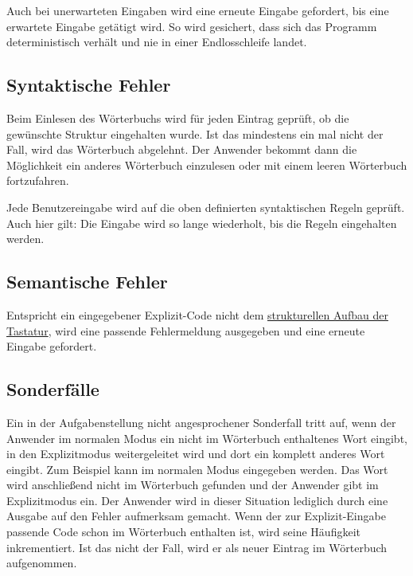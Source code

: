 Auch bei unerwarteten Eingaben wird eine erneute Eingabe gefordert, bis eine erwartete Eingabe getätigt wird.
So wird gesichert, dass sich das Programm deterministisch verhält und nie in einer Endlosschleife landet.

\subsection{Syntaktische Fehler}\label{subsec:syntaktische-fehler-behandlung}
Beim Einlesen des Wörterbuchs wird für jeden Eintrag geprüft, ob die gewünschte Struktur eingehalten wurde.
Ist das mindestens ein mal nicht der Fall, wird das Wörterbuch abgelehnt.
Der Anwender bekommt dann die Möglichkeit ein anderes Wörterbuch einzulesen oder mit einem leeren Wörterbuch fortzufahren.

Jede Benutzereingabe wird auf die oben definierten syntaktischen Regeln geprüft.
Auch hier gilt: Die Eingabe wird so lange wiederholt, bis die Regeln eingehalten werden.

\subsection{Semantische Fehler}\label{subsec:semantische-fehler-behandlung}
Entspricht ein eingegebener Explizit-Code nicht dem \hyperref[tab:tastatur-aufbau]{strukturellen Aufbau der Tastatur}, wird eine passende Fehlermeldung ausgegeben und eine erneute Eingabe gefordert.

\subsection{Sonderfälle}\label{subsec:sonderfaelle}
Ein in der Aufgabenstellung nicht angesprochener Sonderfall tritt auf, wenn der Anwender im normalen Modus ein nicht im Wörterbuch enthaltenes Wort eingibt, in den Explizitmodus weitergeleitet wird und dort ein komplett anderes Wort eingibt.
Zum Beispiel kann im normalen Modus \grqq{} eingegeben werden.
Das Wort wird anschließend nicht im Wörterbuch gefunden und der Anwender gibt im Explizitmodus \grqq{} ein.
Der Anwender wird in dieser Situation lediglich durch eine Ausgabe auf den Fehler aufmerksam gemacht.
Wenn der zur Explizit-Eingabe passende Code \grqq{} schon im Wörterbuch enthalten ist, wird seine Häufigkeit inkrementiert.
Ist das nicht der Fall, wird er als neuer Eintrag im Wörterbuch aufgenommen.